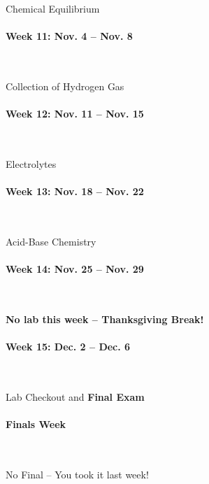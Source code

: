 \documentclass[12pt, letterpaper]{article}
\begin{document}
Chemical Equilibrium

\paragraph{Week 11: Nov. 4 -- Nov. 8}~

Collection of Hydrogen Gas

\paragraph{Week 12: Nov. 11 -- Nov. 15}~

Electrolytes

\paragraph{Week 13: Nov. 18 -- Nov. 22}~

Acid-Base Chemistry

\paragraph{Week 14: Nov. 25 -- Nov. 29}~

\textbf{No lab this week -- Thanksgiving Break!}

\paragraph{Week 15: Dec. 2 -- Dec. 6}~

Lab Checkout and \textbf{Final Exam}

\paragraph{Finals Week}~

No Final -- You took it last week!
\end{document}
